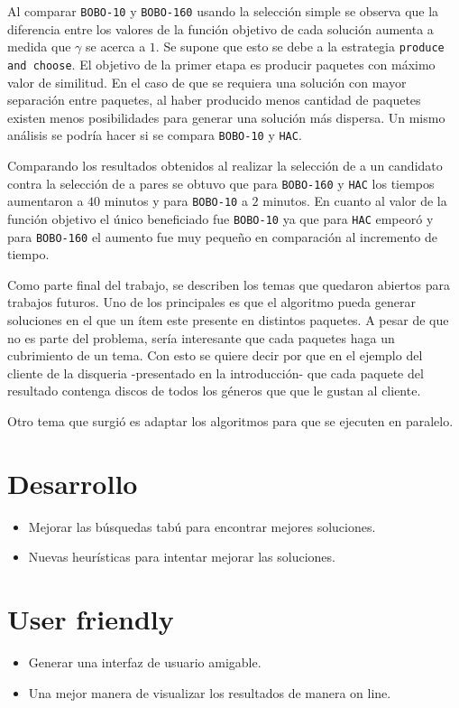 Al comparar \texttt{BOBO-10} y \texttt{BOBO-160} usando la selección simple se observa que la diferencia entre los valores de la función objetivo de cada solución aumenta a medida que $\gamma$ se acerca a $1$. Se supone que esto se debe a la estrategia \texttt{produce and choose}. El objetivo de la primer etapa es producir paquetes con máximo valor de similitud. En el caso de que se requiera una solución con mayor separación entre paquetes, al haber producido menos cantidad de paquetes existen menos posibilidades para generar una solución más dispersa. Un mismo análisis se podría hacer si se compara \texttt{BOBO-10} y \texttt{HAC}.

Comparando los resultados obtenidos al realizar la selección de a un candidato contra la selección de a pares se obtuvo que para \texttt{BOBO-160} y \texttt{HAC} los tiempos aumentaron a $40$ minutos y para \texttt{BOBO-10} a $2$ minutos. En cuanto al valor de la función objetivo el único beneficiado fue \texttt{BOBO-10} ya que para \texttt{HAC} empeoró y para \texttt{BOBO-160} el aumento fue muy pequeño en comparación al incremento de tiempo.


Como parte final del trabajo, se describen los temas que quedaron abiertos para trabajos futuros. Uno de los principales es que el algoritmo pueda generar soluciones en el que un ítem este presente en distintos paquetes. A pesar de que no es parte del problema, sería interesante que cada paquetes haga un cubrimiento de un tema. Con esto se quiere decir por que en el ejemplo del cliente de la disqueria -presentado en la introducción- que cada paquete del resultado contenga discos de todos los géneros que que le gustan al cliente.

Otro tema que surgió es adaptar los algoritmos para que se ejecuten en paralelo.

 

\section{Desarrollo}
\begin{itemize}
 \item Mejorar las búsquedas tabú para encontrar mejores soluciones.
 \item Nuevas heurísticas para intentar mejorar las soluciones.
\end{itemize}

 
\section{User friendly}
\begin{itemize}
 \item Generar una interfaz de usuario amigable.
 \item Una mejor manera de visualizar los resultados de manera on line.
\end{itemize}

